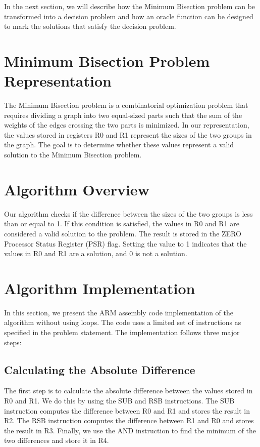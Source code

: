 In the next section, we will describe how the Minimum Bisection problem can be transformed into a decision problem and how an oracle function can be designed to mark the solutions that satisfy the decision problem.

\section{Minimum Bisection Problem Representation}

The Minimum Bisection problem is a combinatorial optimization problem that requires dividing a graph into two equal-sized parts such that the sum of the weights of the edges crossing the two parts is minimized. In our representation, the values stored in registers R0 and R1 represent the sizes of the two groups in the graph. The goal is to determine whether these values represent a valid solution to the Minimum Bisection problem.

\section{Algorithm Overview}

Our algorithm checks if the difference between the sizes of the two groups is less than or equal to 1. If this condition is satisfied, the values in R0 and R1 are considered a valid solution to the problem. The result is stored in the ZERO Processor Status Register (PSR) flag. Setting the value to 1 indicates that the values in R0 and R1 are a solution, and 0 is not a solution.

\section{Algorithm Implementation}

In this section, we present the ARM assembly code implementation of the algorithm without using loops. The code uses a limited set of instructions as specified in the problem statement. The implementation follows three major steps:

\subsection{Calculating the Absolute Difference}

The first step is to calculate the absolute difference between the values stored in R0 and R1. We do this by using the SUB and RSB instructions. The SUB instruction computes the difference between R0 and R1 and stores the result in R2. The RSB instruction computes the difference between R1 and R0 and stores the result in R3. Finally, we use the AND instruction to find the minimum of the two differences and store it in R4.


